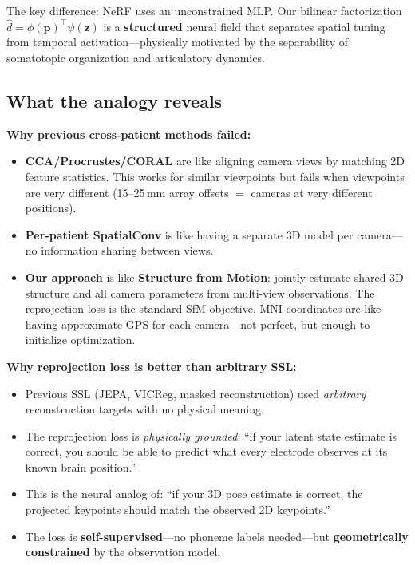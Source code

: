 \documentclass[11pt,letterpaper]{article}
\newcommand{\bfp}{\mathbf{p}}
\newcommand{\bfz}{\mathbf{z}}
\begin{document}
The key difference: NeRF uses an unconstrained MLP. Our bilinear factorization $\hat{d} = \phi(\bfp)^\top \psi(\bfz)$ is a \textbf{structured} neural field that separates spatial tuning from temporal activation---physically motivated by the separability of somatotopic organization and articulatory dynamics.

\subsection{What the analogy reveals}

\textbf{Why previous cross-patient methods failed:}
\begin{itemize}[leftmargin=2em]
\item \textbf{CCA/Procrustes/CORAL} are like aligning camera views by matching 2D feature statistics. This works for similar viewpoints but fails when viewpoints are very different (15--25\,mm array offsets $=$ cameras at very different positions).
\item \textbf{Per-patient SpatialConv} is like having a separate 3D model per camera---no information sharing between views.
\item \textbf{Our approach} is like \textbf{Structure from Motion}: jointly estimate shared 3D structure and all camera parameters from multi-view observations. The reprojection loss is the standard SfM objective. MNI coordinates are like having approximate GPS for each camera---not perfect, but enough to initialize optimization.
\end{itemize}

\textbf{Why reprojection loss is better than arbitrary SSL:}
\begin{itemize}[leftmargin=2em]
\item Previous SSL (JEPA, VICReg, masked reconstruction) used \textit{arbitrary} reconstruction targets with no physical meaning.
\item The reprojection loss is \textit{physically grounded}: ``if your latent state estimate is correct, you should be able to predict what every electrode observes at its known brain position.''
\item This is the neural analog of: ``if your 3D pose estimate is correct, the projected keypoints should match the observed 2D keypoints.''
\item The loss is \textbf{self-supervised}---no phoneme labels needed---but \textbf{geometrically constrained} by the observation model.
\end{itemize}
\end{document}
